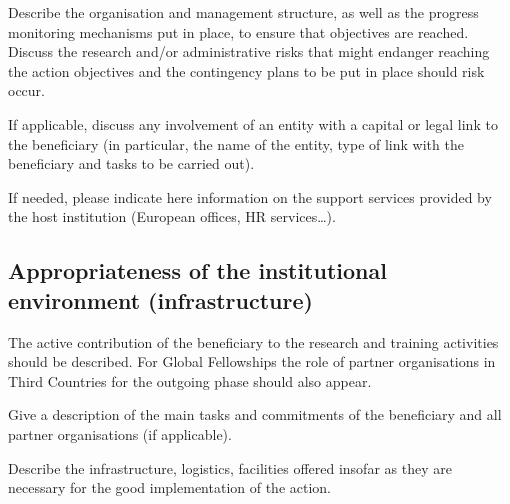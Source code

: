 \medskip\noindent
Describe the organisation and management structure, as well as the
progress monitoring mechanisms put in place, to ensure that
objectives are reached. Discuss the research and/or administrative
risks that might endanger reaching the action objectives and the
contingency plans to be put in place should risk occur.

\medskip\noindent
If applicable, discuss any involvement of an entity with a capital
or legal link to the beneficiary (in particular, the name of the
entity, type of link with the beneficiary and tasks to be carried
out). 

\medskip\noindent
If needed, please indicate here information on the support
services provided by the host institution (European offices, HR
services\dots).

\subsection{Appropriateness of the institutional environment
(infrastructure)}
\label{sec:implementation_infrastructure}

\medskip\noindent
The active contribution of the beneficiary to the research and
training activities should be described. For Global Fellowships
the role of partner organisations in Third Countries for the
outgoing phase should also appear.


\medskip\noindent
Give a description of the main tasks and commitments of the
beneficiary and all partner organisations (if applicable).

\medskip\noindent
Describe the infrastructure, logistics, facilities offered insofar
as they are necessary for the good implementation of the action.

\markEndPageLimit
